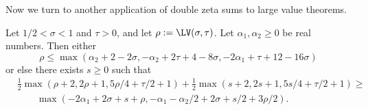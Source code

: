 Now we turn to another application of double zeta sums to large value theorems.

    \begin{theorem}\label{bourgain-lvt} \cite{bourgain_large_2000} Let $1/2 < \sigma < 1$ and $\tau > 0$, and let $\rho := \LV(\sigma,\tau)$.  Let $\alpha_1, \alpha_2 \geq 0$ be real numbers.  Then either
    \begin{equation}\label{rho1}
     \rho \leq \max( \alpha_2 + 2 - 2 \sigma, -\alpha_2 + 2\tau+4-8\sigma, -2\alpha_1 + \tau + 12 - 16 \sigma)
    \end{equation}
    or else there exists $s \geq 0$ such that
    \begin{equation}\label{rs}
    \begin{split}
         &\frac{1}{2}\max(\rho+2, 2\rho+1, 5\rho/4 + \tau/2 + 1) + \frac{1}{2}\max(s+2, 2s+1, 5s/4 + \tau/2 + 1) \geq \\
            &\qquad\max( -2\alpha_1 + 2\sigma + s + \rho, -\alpha_1 - \alpha_2/2 + 2\sigma + s/2 + 3\rho/2).
    \end{split}
    \end{equation}
    \end{theorem}

